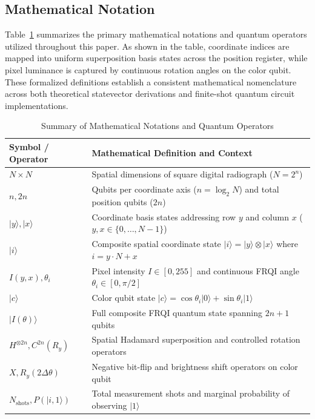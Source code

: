 \documentclass[12pt,onecolumn,draftclsnofoot]{IEEEtran}
\begin{document}
\subsection{Mathematical Notation}
Table~\ref{tab:notation} summarizes the primary mathematical notations and quantum operators utilized throughout this paper. As shown in the table, coordinate indices are mapped into uniform superposition basis states across the position register, while pixel luminance is captured by continuous rotation angles on the color qubit. These formalized definitions establish a consistent mathematical nomenclature across both theoretical statevector derivations and finite-shot quantum circuit implementations.

\begin{table}[t]
\centering
\caption{Summary of Mathematical Notations and Quantum Operators}
\label{tab:notation}
\footnotesize
\begin{tabular}{@{}ll@{}}
\toprule
\textbf{Symbol / Operator} & \textbf{Mathematical Definition and Context} \\
\midrule
$N \times N$ & Spatial dimensions of square digital radiograph ($N = 2^n$) \\
$n, 2n$ & Qubits per coordinate axis ($n = \log_2 N$) and total position qubits ($2n$) \\
$|y\rangle, |x\rangle$ & Coordinate basis states addressing row $y$ and column $x$ ($y, x \in \{0, \dots, N-1\}$) \\
$|i\rangle$ & Composite spatial coordinate state $|i\rangle = |y\rangle \otimes |x\rangle$ where $i = y \cdot N + x$ \\
$I(y, x), \theta_i$ & Pixel intensity $I \in [0, 255]$ and continuous FRQI angle $\theta_i \in [0, \pi/2]$ \\
$|c\rangle$ & Color qubit state $|c\rangle = \cos\theta_i |0\rangle + \sin\theta_i |1\rangle$ \\
$|I(\theta)\rangle$ & Full composite FRQI quantum state spanning $2n+1$ qubits \\
$H^{\otimes 2n}, C^{2n}(R_y)$ & Spatial Hadamard superposition and controlled rotation operators \\
$X, R_y(2\Delta\theta)$ & Negative bit-flip and brightness shift operators on color qubit \\
$N_{\text{shots}}, P(|i, 1\rangle)$ & Total measurement shots and marginal probability of observing $|1\rangle$ \\
\bottomrule
\end{tabular}
\end{table}
\end{document}
